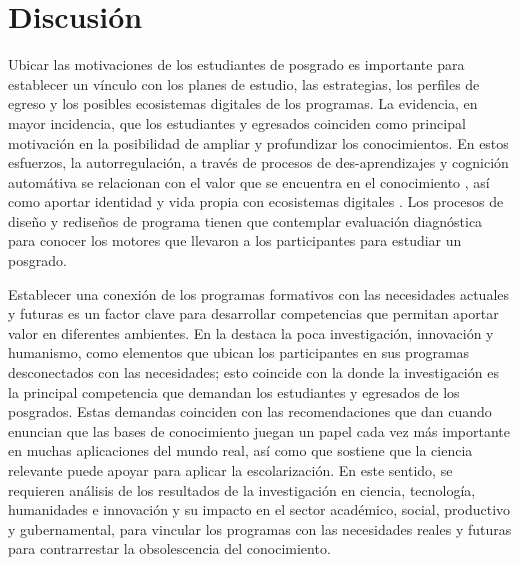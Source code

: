 \documentclass{textolivre}
\begin{document}
\section{Discusión}\label{sec-secoes}
Ubicar las motivaciones de los estudiantes de posgrado es importante para establecer un vínculo con los planes de estudio, las estrategias, los perfiles de egreso y los posibles ecosistemas digitales de los programas. La  evidencia, en mayor incidencia, que los estudiantes y egresados coinciden como principal motivación en la posibilidad de ampliar y profundizar los conocimientos. En estos esfuerzos, la autorregulación, a través de procesos de des-aprendizajes y cognición automátiva se relacionan con el valor que se encuentra en el conocimiento \cite{helfrich_how_2018}, así como aportar identidad y vida propia con ecosistemas digitales \cite{islas_ecosistemas_2017}. Los procesos de diseño y rediseños de programa tienen que contemplar evaluación diagnóstica para conocer los motores que llevaron a los participantes para estudiar un posgrado.

Establecer una conexión de los programas formativos con las necesidades actuales y futuras es un factor clave para desarrollar competencias que permitan aportar valor en diferentes ambientes. En la  destaca la poca investigación, innovación y humanismo, como elementos que ubican los participantes en sus programas desconectados con las necesidades; esto coincide con la  donde la investigación es la principal competencia que demandan los estudiantes y egresados de los posgrados. Estas demandas coinciden con las recomendaciones que dan \textcite{liang_how_2017} cuando enuncian que las bases de conocimiento juegan un papel cada vez más importante en muchas aplicaciones del mundo real, así como \textcite{dorsch_issue_2018} que sostiene que la ciencia relevante puede apoyar para aplicar la escolarización. En este sentido, se requieren análisis de los resultados de la investigación en ciencia, tecnología, humanidades e innovación y su impacto en el sector académico, social, productivo y gubernamental, para vincular los programas con las necesidades reales y futuras para contrarrestar la obsolescencia del conocimiento.
\end{document}
